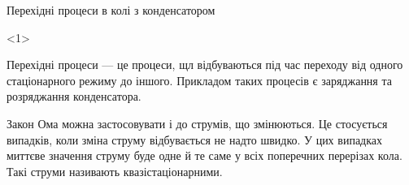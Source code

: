 \documentclass[onlytextwidth]{beamer}
\begin{document}
\begin{frame}{Перехідні процеси в колі з конденсатором}{}
	\begin{onlyenv}
		\begin{block}{}\justifying
			\alert{Перехідні процеси} --- це процеси, щл відбуваються під час переходу від одного стаціонарного режиму до іншого.
			Прикладом таких процесів є заряджання та розряджання конденсатора.
		\end{block}
		\begin{alertblock}{}\justifying
			Закон Ома можна застосовувати і до струмів, що змінюються. Це стосується випадків, коли зміна струму відбувається не надто швидко. У цих
			випадках \alert{миттєве значення струму буде одне й те саме у всіх поперечних перерізах кола}. Такі струми називають
			\alert{квазістаціонарними}.

			\bigskip


\end{alertblock}
\end{onlyenv}
\end{frame}
\end{document}
